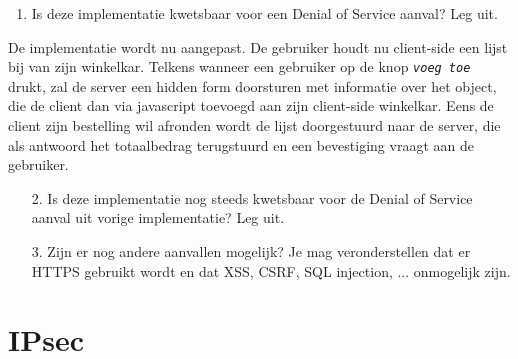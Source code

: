 \documentclass{article}
\begin{document}
\begin{enumerate}
    \item Is deze implementatie kwetsbaar voor een Denial of Service aanval? Leg uit.
\end{enumerate}

De implementatie wordt nu aangepast. De gebruiker houdt nu client-side een lijst bij van zijn winkelkar. Telkens wanneer een gebruiker op de knop \emph{\texttt{voeg toe}} drukt, zal de server een hidden form doorsturen met informatie over het object, die de client dan via javascript toevoegd aan zijn client-side winkelkar. Eens de client zijn bestelling wil afronden wordt de lijst doorgestuurd naar de server, die als antwoord het totaalbedrag terugstuurd en een bevestiging vraagt aan de gebruiker.

\begin{enumerate}
    \item[2.] Is deze implementatie nog steeds kwetsbaar voor de Denial of Service aanval uit vorige implementatie? Leg uit.
    \item[3.] Zijn er nog andere aanvallen mogelijk? Je mag veronderstellen dat er HTTPS gebruikt wordt en dat XSS, CSRF, SQL injection, ... onmogelijk zijn.
\end{enumerate}
    
\section{IPsec}
\end{document}

